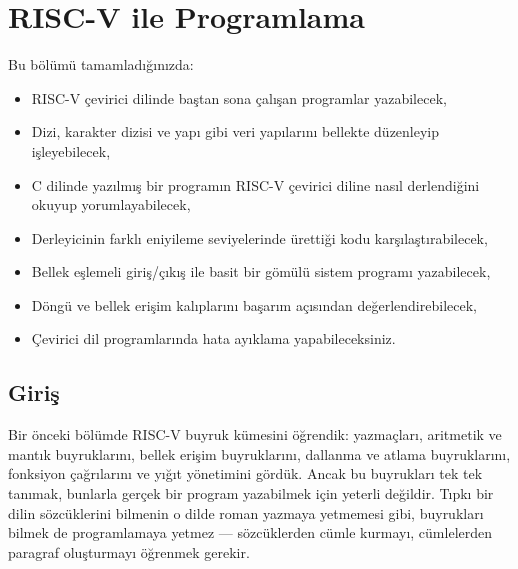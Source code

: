 
\chapter{RISC-V ile Programlama}
\label{chap:programlama}

\begin{tcolorbox}[
    colback=blokyesil!15,
    colframe=sinyalyesil!60!black,
    title={\textbf{Öğrenme Hedefleri}},
    fonttitle=\bfseries,
    rounded corners,
    boxrule=0.8pt
]
Bu bölümü tamamladığınızda:
\begin{itemize}[leftmargin=*]
\item RISC-V çevirici dilinde baştan sona çalışan programlar yazabilecek,
\item Dizi, karakter dizisi ve yapı gibi veri yapılarını bellekte düzenleyip işleyebilecek,
\item C dilinde yazılmış bir programın RISC-V çevirici diline nasıl derlendiğini okuyup yorumlayabilecek,
\item Derleyicinin farklı eniyileme seviyelerinde ürettiği kodu karşılaştırabilecek,
\item Bellek eşlemeli giriş/çıkış ile basit bir gömülü sistem programı yazabilecek,
\item Döngü ve bellek erişim kalıplarını başarım açısından değerlendirebilecek,
\item Çevirici dil programlarında hata ayıklama yapabileceksiniz.
\end{itemize}
\end{tcolorbox}

\section*{Giriş}

Bir önceki bölümde RISC-V buyruk kümesini öğrendik: yazmaçları, aritmetik ve mantık buyruklarını, bellek erişim buyruklarını, dallanma ve atlama buyruklarını, fonksiyon çağrılarını ve yığıt yönetimini gördük. Ancak bu buyrukları tek tek tanımak, bunlarla gerçek bir program yazabilmek için yeterli değildir. Tıpkı bir dilin sözcüklerini bilmenin o dilde roman yazmaya yetmemesi gibi, buyrukları bilmek de programlamaya yetmez --- sözcüklerden cümle kurmayı, cümlelerden paragraf oluşturmayı öğrenmek gerekir.


